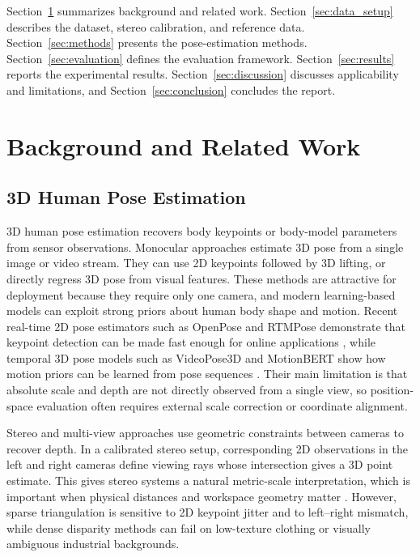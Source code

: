 \documentclass[12pt,a4paper]{article}
\begin{document}
Section~\ref{sec:background} summarizes background and related work.
Section~\ref{sec:data_setup} describes the dataset, stereo calibration, and
reference data.
Section~\ref{sec:methods} presents the pose-estimation methods.
Section~\ref{sec:evaluation} defines the evaluation framework.
Section~\ref{sec:results} reports the experimental results.
Section~\ref{sec:discussion} discusses applicability and limitations, and
Section~\ref{sec:conclusion} concludes the report.

\clearpage
\section{Background and Related Work}
\label{sec:background}

\subsection{3D Human Pose Estimation}

3D human pose estimation recovers body keypoints or body-model parameters from
sensor observations.
Monocular approaches estimate 3D pose from a single image or video stream.
They can use 2D keypoints followed by 3D lifting, or directly regress 3D pose
from visual features.
These methods are attractive for deployment because they require only one
camera, and modern learning-based models can exploit strong priors about human
body shape and motion.
Recent real-time 2D pose estimators such as OpenPose and RTMPose demonstrate
that keypoint detection can be made fast enough for online applications
\cite{cao2019openpose,jiang2023rtmpose}, while temporal 3D pose models such as
VideoPose3D and MotionBERT show how motion priors can be learned from pose
sequences \cite{pavllo20193d,zhu2023motionbert}.
Their main limitation is that absolute scale and depth are not directly
observed from a single view, so position-space evaluation often requires
external scale correction or coordinate alignment.

Stereo and multi-view approaches use geometric constraints between cameras to
recover depth.
In a calibrated stereo setup, corresponding 2D observations in the left and
right cameras define viewing rays whose intersection gives a 3D point estimate.
This gives stereo systems a natural metric-scale interpretation, which is
important when physical distances and workspace geometry matter
\cite{hartley2004multiple}.
However, sparse triangulation is sensitive to 2D keypoint jitter and to
left--right mismatch, while dense disparity methods can fail on low-texture
clothing or visually ambiguous industrial backgrounds.
\end{document}
